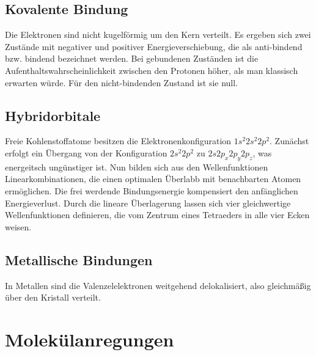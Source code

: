 \documentclass[11pt]{article}
\begin{document}
\subsection{Kovalente Bindung}
Die Elektronen sind nicht kugelförmig um den Kern verteilt. Es ergeben sich
zwei Zustände mit negativer und positiver Energieverschiebung, die als
anti-bindend bzw. bindend bezeichnet werden. Bei gebundenen Zuständen ist die
Aufenthaltswahrscheinlichkeit zwischen den Protonen höher, als man klassisch
erwarten würde. Für den nicht-bindenden Zustand ist sie null.
\subsection{Hybridorbitale}
Freie Kohlenstoffatome besitzen die Elektronenkonfiguration $1s^2 2s^2 2p^2$.
Zunächst erfolgt ein Übergang von der Konfiguration $2s^2 2p^2$ zu $2s 2p_x 2p_y
 2p_z$, was energeitsch ungünstiger ist. Nun bilden sich aus den
Wellenfunktionen Linearkombinationen, die einen optimalen Überlabb mit
benachbarten Atomen ermöglichen. Die frei werdende Bindungsenergie kompensiert
den anfänglichen Energieverlust. Durch die lineare Überlagerung lassen sich
vier gleichwertige Wellenfunktionen definieren, die vom Zentrum eines Tetraeders
in alle vier Ecken weisen.
\subsection{Metallische Bindungen}
In Metallen sind die Valenzelelektronen weitgehend delokalisiert, also
gleichmäßig über den Kristall verteilt.
\section{Molekülanregungen}
\end{document}
